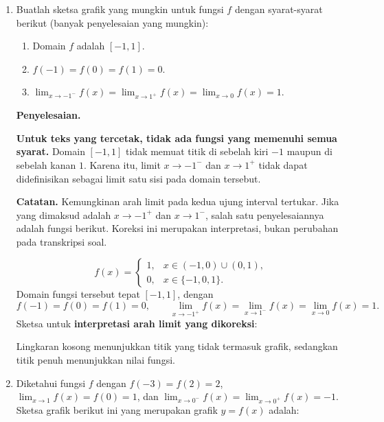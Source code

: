 \documentclass[11pt,a4paper]{article}
\newcommand{\jawab}{\par\medskip\textbf{Penyelesaian.}\par}
\newcommand{\catatan}[1]{\par\smallskip\textbf{Catatan.} #1\par}
\begin{document}
\begin{enumerate}
\item[8.] Buatlah sketsa grafik yang mungkin untuk fungsi $f$ dengan syarat-syarat
berikut (banyak penyelesaian yang mungkin):
\begin{enumerate}
    \item Domain $f$ adalah $[-1,1]$.
    \item $f(-1)=f(0)=f(1)=0$.
    \item $\displaystyle
        \lim_{x\to -1^-}f(x)=\lim_{x\to 1^+}f(x)=\lim_{x\to 0}f(x)=1$.
\end{enumerate}

\jawab
\textbf{Untuk teks yang tercetak, tidak ada fungsi yang memenuhi semua
syarat.} Domain $[-1,1]$ tidak memuat titik di sebelah kiri $-1$ maupun
di sebelah kanan $1$. Karena itu, limit $x\to -1^-$ dan $x\to 1^+$
tidak dapat didefinisikan sebagai limit satu sisi pada domain tersebut.

\catatan{Kemungkinan arah limit pada kedua ujung interval tertukar.
Jika yang dimaksud adalah $x\to -1^+$ dan $x\to 1^-$, salah satu
penyelesaiannya adalah fungsi berikut. Koreksi ini merupakan interpretasi,
bukan perubahan pada transkripsi soal.}
\[
    f(x)=
    \begin{cases}
        1, & x\in(-1,0)\cup(0,1),\\
        0, & x\in\{-1,0,1\}.
    \end{cases}
\]
Domain fungsi tersebut tepat $[-1,1]$, dengan
\[
    f(-1)=f(0)=f(1)=0,\qquad
    \lim_{x\to -1^+}f(x)=\lim_{x\to 1^-}f(x)=\lim_{x\to 0}f(x)=1.
\]
Sketsa untuk \textbf{interpretasi arah limit yang dikoreksi}:
\begin{center}
\end{center}
Lingkaran kosong menunjukkan titik yang tidak termasuk grafik, sedangkan
titik penuh menunjukkan nilai fungsi.

\newpage
\item[15.] Diketahui fungsi $f$ dengan $f(-3)=f(2)=2$,
$\displaystyle\lim_{x\to 1}f(x)=f(0)=1$, dan
$\displaystyle\lim_{x\to 0^-}f(x)=\lim_{x\to 0^+}f(x)=-1$.
Sketsa grafik berikut ini yang merupakan grafik $y=f(x)$ adalah:


\end{enumerate}
\end{document}
